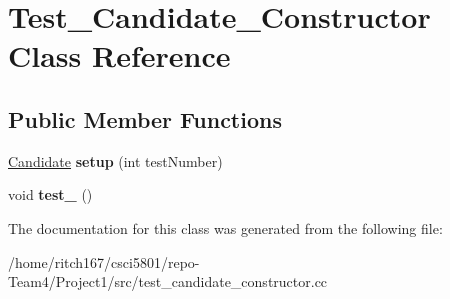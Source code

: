 \hypertarget{classTest__Candidate__Constructor}{}\section{Test\+\_\+\+Candidate\+\_\+\+Constructor Class Reference}
\label{classTest__Candidate__Constructor}
\subsection*{Public Member Functions}
\begin{DoxyCompactItemize}
\item 
\mbox{\label{classTest__Candidate__Constructor_ab00abfaa7b60a12c24d6fda81fd26096}} 
\hyperlink{classCandidate}{Candidate} {\bfseries setup} (int test\+Number)
\item 
\mbox{\label{classTest__Candidate__Constructor_aaa43e9421e0a35aed970aca8bc393cc1}} 
void {\bfseries test\+\_} ()
\end{DoxyCompactItemize}


The documentation for this class was generated from the following file\+:\begin{DoxyCompactItemize}
\item 
/home/ritch167/csci5801/repo-\/\+Team4/\+Project1/src/test\+\_\+candidate\+\_\+constructor.\+cc\end{DoxyCompactItemize}
